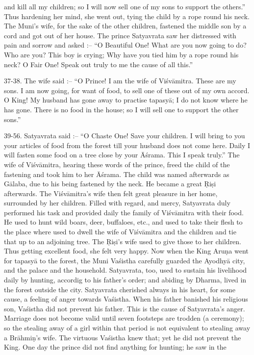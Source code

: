 and kill all my children; so I will now sell one of my sons to support the others.'' Thus hardening her mind, she went out, tying the child by a rope round his neck. The Muni's wife, for the sake of the other children, fastened the middle son by a cord and got out of her house. The prince Satyavrata saw her distressed with pain and sorrow and asked :-- ``O Beautiful One! What are you now going to do? Who are you? This boy is crying; Why have you tied him by a rope round his neck? O Fair One! Speak out truly to me the cause of all this.''

37-38. The wife said :-- ``O Prince! I am the wife of Vi\'sv\=amitra. These are my sons. I am now going, for want of food, to sell one of these out of my own accord. O King! My husband has gone away to practise tapasy\=a; I do not know where he has gone. There is no food in the house; so I will sell one to support the other sons.''

39-56. Satyavrata said :-- ``O Chaste One! Save your children. I will bring to you your articles of food from the forest till your husband does not come here. Daily I will fasten some food on a tree close by your \=A\'srama. This I speak truly.'' The wife of Vi\'sv\=amitra, hearing these words of the prince, freed the child of the fastening and took him to her \=A\'srama. The child was named afterwards as G\=alaba, due to his being fastened by the neck. He became a great \d{R}i\d{s}i afterwards. The Vi\'sv\=amitra's wife then felt great pleasure in her home, surrounded by her children. Filled with regard, and mercy, Satyavrata duly performed his task and provided daily the family of Vi\'sv\=amitra with their food. He used to hunt wild boars, deer, buffaloes, etc., and used to take their flesh to the place where used to dwell the wife of Vi\'sv\=amitra and the children and tie that up to an adjoining tree. The \d{R}i\d{s}i's wife used to give those to her children. Thus getting excellent food, she felt very happy. Now when the King Aru\d{n}a went for tapasy\=a to the forest, the Muni Va\'sistha carefully guarded the Ayodhy\=a city, and the palace and the household. Satyavrata, too, used to sustain his livelihood daily by hunting, accordig to his father's order; and abiding by Dharma, lived in the forest outside the city. Satyavrata cherished always in his heart, for some cause, a feeling of anger towards Va\'sistha. When his father banished his religious son, Va\'sistha did not prevent his father. This is the cause of Satyavrata's anger. Marriage does not become valid until seven footsteps are trodden (a ceremony); so the stealing away of a girl within that period is not equivalent to stealing away a Br\=ahmi\d{n}'s wife. The virtuous Va\'sistha knew that; yet he did not prevent the King. One day the prince did not find anything for hunting; he saw in the


